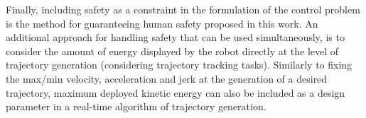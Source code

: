 Finally, including safety as a constraint in the formulation of the control problem is the method for guaranteeing human safety proposed in this work. An additional approach for handling safety that can be used simultaneously, is to consider the amount of energy displayed by the robot directly at the level of trajectory generation (considering trajectory tracking tasks). Similarly to fixing the max/min velocity, acceleration and jerk at the generation of a desired trajectory, maximum deployed kinetic energy can also be included as a design parameter in a real-time algorithm of trajectory generation. 
























